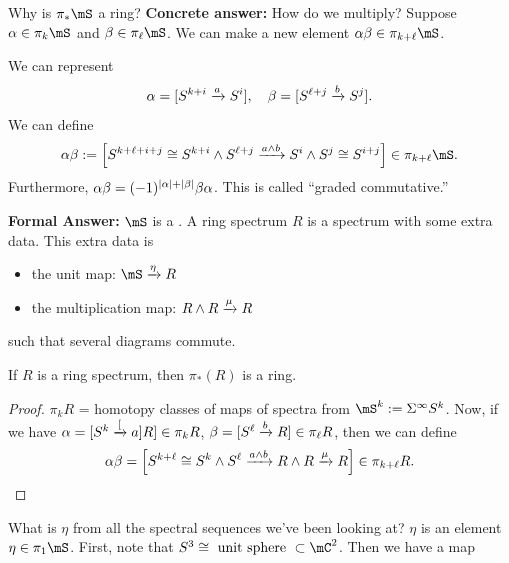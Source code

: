 \newpage
\begin{question}{Why is $\pi_\ast \mS$ a ring?}{}
    \textbf{Concrete answer:} How do we multiply? Suppose $\alpha\in \pi_k\mS$ and $\beta\in \pi_\ell \mS$. We can make a new element $\alpha\beta \in \pi_{k+\ell}\mS$. 

    We can represent $$\alpha = [S^{k+i}\xrightarrow{a}S^i],\quad \beta = [S^{\ell+j}\xrightarrow{b}S^{j}].$$ We can define $$\alpha\beta:=\bracks{S^{k+\ell + i+ j}\cong S^{k+i}\wedge S^{\ell + j}\xr{a\wedge b}S^i\wedge S^j\cong S^{i+j}}\in \pi_{k+\ell}\mS.$$ Furthermore, $\alpha\beta = (-1)^{\left| \alpha \right|+\left| \beta \right|}\beta\alpha$. This is called ``graded commutative.''

    \bigskip
    \textbf{Formal Answer:} $\mS$ is a . A ring spectrum $R$ is a spectrum with some extra data. This extra data is 
    \begin{itemize}
        \item the unit map: $\mS\xr{\eta} R$ 
        \item the multiplication map: $R\wedge R\xrightarrow{\mu}R$
    \end{itemize}
    such that several diagrams commute. 

    \medskip
    \begin{claim}{}{}
        If $R$ is a ring spectrum, then $\pi_\ast(R)$ is a ring. 
    \end{claim}
    \begin{proof}
        $\pi_k R$ = homotopy classes of maps of spectra from $\mS^k:=\Sigma^\infty S^k$. Now, if we have $\alpha = [S^k\xrightarrow{[}a]R]\in \pi_k R$, $\beta = [S^\ell\xrightarrow{b}R]\in \pi_\ell R$, then we can define $$\alpha\beta = \left\lbrack S^{k+\ell}\cong S^k\wedge S^\ell\xrightarrow{a\wedge b}R\wedge R\xrightarrow{\mu}R \right\rbrack\in \pi_{k+\ell}R. $$
    \end{proof}
\end{question}

\begin{question}{What is $\eta$ from all the spectral sequences we've been looking at?}{}
    $\eta$ is an element $\eta\in \pi_1\mS$. First, note that $S^3\cong \text{ unit sphere }\subset \mC^2$. Then we have a map \begin{center}
    \end{center}
\end{question}

